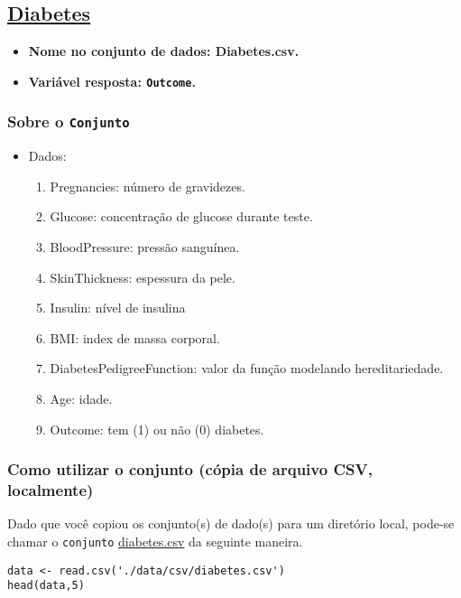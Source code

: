 \documentclass[11pt]{article}
\begin{document}
\subsection{\href{https://www.kaggle.com/uciml/pima-indians-diabetes-database}{Diabetes}}
\label{sec:orgb539135}
\begin{itemize}
\item \textbf{Nome no conjunto de dados: \textbf{Diabetes.csv}.}
\item \textbf{Variável resposta:  \texttt{Outcome}.}
\end{itemize}
\subsubsection{Sobre o \texttt{Conjunto}}
\label{sec:org21a6abf}
\begin{itemize}
\item Dados:
\begin{enumerate}
\item Pregnancies: número de gravidezes.
\item Glucose: concentração de glucose durante teste.
\item BloodPressure: pressão sanguínea.
\item SkinThickness: espessura da pele.
\item Insulin: nível de insulina
\item BMI: index de massa corporal.
\item DiabetesPedigreeFunction: valor da função modelando hereditariedade.
\item Age: idade.
\item Outcome: tem (1) ou não (0) diabetes.
\end{enumerate}
\end{itemize}
\subsubsection{Como utilizar o conjunto (cópia de arquivo CSV, localmente)}
\label{sec:orgd893c52}

Dado que você copiou os conjunto(s) de dado(s) para um diretório
local, pode-se chamar o \texttt{conjunto} \href{https://drive.google.com/file/d/19eaULwopwE1hco\_R9QZIXqDuA3CS2OBh/view?usp=sharing}{diabetes.csv} da seguinte maneira.

\begin{verbatim}
data <- read.csv('./data/csv/diabetes.csv')
head(data,5)
\end{verbatim}
\end{document}
